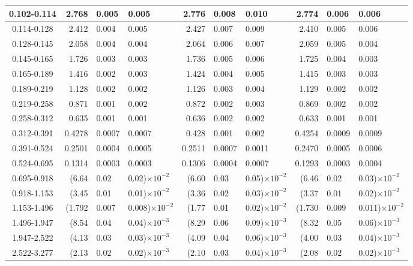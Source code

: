 \begin{table}[!htbp]
{\begin{tabular}{ | c | r@{$\pm$}l@{$\pm$}l | r@{$\pm$}l@{$\pm$}l | r@{$\pm$}l@{$\pm$}l | }
0.102-0.114 & 2.768&0.005&0.005 & 2.776&0.008&0.010 & 2.774&0.006&0.006 \\ \hline
0.114-0.128 & 2.412&0.004&0.005 & 2.427&0.007&0.009 & 2.410&0.005&0.006 \\ \hline
0.128-0.145 & 2.058&0.004&0.004 & 2.064&0.006&0.007 & 2.059&0.005&0.004 \\ \hline
0.145-0.165 & 1.726&0.003&0.003 & 1.736&0.005&0.006 & 1.725&0.004&0.003 \\ \hline
0.165-0.189 & 1.416&0.002&0.003 & 1.424&0.004&0.005 & 1.415&0.003&0.003 \\ \hline
0.189-0.219 & 1.128&0.002&0.002 & 1.126&0.003&0.004 & 1.129&0.002&0.002 \\ \hline
0.219-0.258 & 0.871&0.001&0.002 & 0.872&0.002&0.003 & 0.869&0.002&0.002 \\ \hline
0.258-0.312 & 0.635&0.001&0.001 & 0.636&0.002&0.002 & 0.633&0.001&0.001 \\ \hline
0.312-0.391 & 0.4278&0.0007&0.0007 & 0.428&0.001&0.002 & 0.4254&0.0009&0.0009 \\ \hline
0.391-0.524 & 0.2501&0.0004&0.0005 & 0.2511&0.0007&0.0011 & 0.2470&0.0005&0.0006 \\ \hline
0.524-0.695 & 0.1314&0.0003&0.0003 & 0.1306&0.0004&0.0007 & 0.1293&0.0003&0.0004 \\ \hline
0.695-0.918 & (6.64&0.02&0.02)$\times 10^{-2}$ & (6.60&0.03&0.05)$\times 10^{-2}$ & (6.46&0.02&0.03)$\times 10^{-2}$ \\ \hline
0.918-1.153 & (3.45&0.01&0.01)$\times 10^{-2}$ & (3.36&0.02&0.03)$\times 10^{-2}$ & (3.37&0.01&0.02)$\times 10^{-2}$ \\ \hline
1.153-1.496 & (1.792&0.007&0.008)$\times 10^{-2}$ & (1.77&0.01&0.02)$\times 10^{-2}$ & (1.730&0.009&0.011)$\times 10^{-2}$ \\ \hline
1.496-1.947 & (8.54&0.04&0.04)$\times 10^{-3}$ & (8.29&0.06&0.09)$\times 10^{-3}$ & (8.32&0.05&0.06)$\times 10^{-3}$ \\ \hline
1.947-2.522 & (4.13&0.03&0.03)$\times 10^{-3}$ & (4.09&0.04&0.06)$\times 10^{-3}$ & (4.00&0.03&0.04)$\times 10^{-3}$ \\ \hline
2.522-3.277 & (2.13&0.02&0.02)$\times 10^{-3}$ & (2.10&0.03&0.04)$\times 10^{-3}$ & (2.08&0.02&0.02)$\times 10^{-3}$ \\ \hline
\end{tabular}}
\end{table}
\clearpage 

